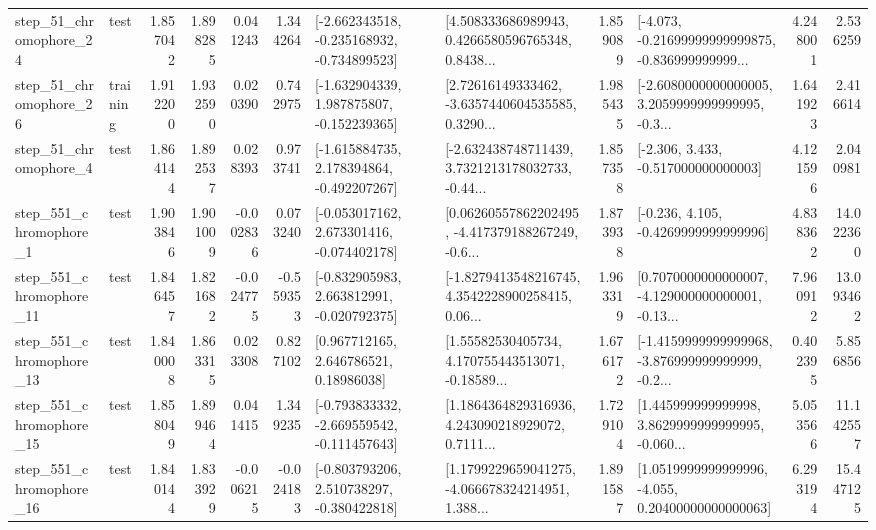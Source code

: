 \begin{tabular}{llrrrrllrlrr}
   step\_51\_chromophore\_24 &      test &      1.857042 &    1.898285 &      0.041243 &  1.344264 &  [-2.662343518, -0.235168932, -0.734899523] &  [4.508333686989943, 0.4266580596765348, 0.8438... &       1.859089 &  [-4.073, -0.21699999999999875, -0.836999999999... &            4.248001 &          2.536259 \\
   step\_51\_chromophore\_26 &  training &      1.912200 &    1.932590 &      0.020390 &  0.742975 &   [-1.632904339, 1.987875807, -0.152239365] &  [2.72616149333462, -3.6357440604535585, 0.3290... &       1.985435 &  [-2.6080000000000005, 3.2059999999999995, -0.3... &            1.641923 &          2.416614 \\
    step\_51\_chromophore\_4 &      test &      1.864144 &    1.892537 &      0.028393 &  0.973741 &   [-1.615884735, 2.178394864, -0.492207267] &  [-2.632438748711439, 3.7321213178032733, -0.44... &       1.857358 &                [-2.306, 3.433, -0.517000000000003] &            4.121596 &          2.040981 \\
   step\_551\_chromophore\_1 &      test &      1.903846 &    1.901009 &     -0.002836 &  0.073240 &   [-0.053017162, 2.673301416, -0.074402178] &  [0.06260557862202495, -4.417379188267249, -0.6... &       1.873938 &               [-0.236, 4.105, -0.4269999999999996] &            4.838362 &         14.022360 \\
  step\_551\_chromophore\_11 &      test &      1.846457 &    1.821682 &     -0.024775 & -0.559353 &   [-0.832905983, 2.663812991, -0.020792375] &  [-1.8279413548216745, 4.3542228900258415, 0.06... &       1.963319 &  [0.7070000000000007, -4.129000000000001, -0.13... &            7.960912 &         13.093462 \\
  step\_551\_chromophore\_13 &      test &      1.840008 &    1.863315 &      0.023308 &  0.827102 &      [0.967712165, 2.646786521, 0.18986038] &  [1.55582530405734, 4.170755443513071, -0.18589... &       1.676172 &  [-1.4159999999999968, -3.876999999999999, -0.2... &            0.402395 &          5.856856 \\
  step\_551\_chromophore\_15 &      test &      1.858049 &    1.899464 &      0.041415 &  1.349235 &  [-0.793833332, -2.669559542, -0.111457643] &  [1.1864364829316936, 4.243090218929072, 0.7111... &       1.729104 &  [1.445999999999998, 3.8629999999999995, -0.060... &            5.053566 &         11.142557 \\
  step\_551\_chromophore\_16 &      test &      1.840144 &    1.833929 &     -0.006215 & -0.024183 &   [-0.803793206, 2.510738297, -0.380422818] &  [1.1799229659041275, -4.066678324214951, 1.388... &       1.891587 &  [1.0519999999999996, -4.055, 0.20400000000000063] &            6.293194 &         15.447125 \\

\end{tabular}
